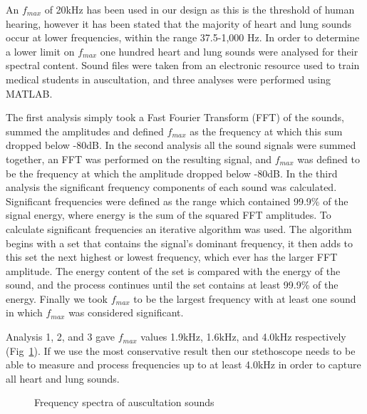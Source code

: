 An $f_{max}$ of 20kHz has been used in our design as this is the threshold of human hearing\cite[p.~163]{Stuart2011}, however it has been stated that the majority of heart and lung sounds occur at lower frequencies, within the range 37.5-1,000 Hz\cite{Abella1992}. In order to determine a lower limit on $f_{max}$ one hundred heart and lung sounds were analysed for their spectral content. Sound files were taken from an electronic resource used to train medical students in auscultation\cite{Coviello2014}, and three analyses were performed using MATLAB. 

The first analysis simply took a Fast Fourier Transform (FFT) of the sounds, summed the amplitudes and defined $f_{max}$ as the frequency at which this sum dropped below -80dB. In the second analysis all the sound signals were summed together, an FFT was performed on the resulting signal, and $f_{max}$ was defined to be the frequency at which the amplitude dropped below -80dB. In the third analysis the significant frequency components of each sound was calculated. Significant frequencies were defined as the range which contained 99.9\% of the signal energy, where energy is the sum of the squared FFT amplitudes. To calculate significant frequencies an iterative algorithm was used. The algorithm begins with a set that contains the signal's dominant frequency, it then adds to this set the next highest or lowest frequency, which ever has the larger FFT amplitude. The energy content of the set is compared with the energy of the sound, and the process continues until the set contains at least 99.9\% of the energy. Finally we took $f_{max}$ to be the largest frequency with at least one sound in which $f_{max}$ was considered significant. 

Analysis 1, 2, and 3 gave $f_{max}$ values 1.9kHz, 1.6kHz, and 4.0kHz respectively (Fig~\ref{fig:ausc_spectra}). If we use the most conservative result then our stethoscope needs to be able to measure and process frequencies up to at least 4.0kHz in order to capture all heart and lung sounds.

\begin{figure}[htb]
	\centering
	\caption{Frequency spectra of auscultation sounds}
	\label{fig:ausc_spectra}
\end{figure}



